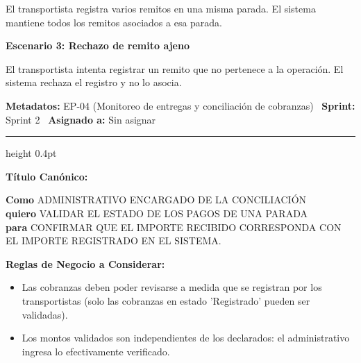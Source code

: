 \documentclass[a4paper,9pt]{article}
\begin{document}
\begin{tcolorbox}[hucard, title={\textbf{HU-36: REGISTRO DE REMITOS} \hfill \scriptsize \colorbox{redstatus}{\textbf{\ Rejected\ }} \quad \colorbox{white}{\textcolor{primarydark}{\textbf{\ 3 pts\ }}}}]
{El transportista registra varios remitos en una misma parada. El sistema mantiene todos los remitos asociados a esa parada.\par\vspace{2.5pt}
\noindent\textbf{\textcolor{secondarydark}{Escenario 3:  Rechazo de remito ajeno}}\par\vspace{1pt}
El transportista intenta registrar un remito que no pertenece a la operación. El sistema rechaza el registro y no lo asocia.\par\vspace{2.5pt}
}\par
\end{tcolorbox}

\begin{tcolorbox}[hucard, title={\textbf{HU-49: VALIDAR COBRANZA} \hfill \scriptsize \colorbox{bluestatus}{\textbf{\ New\ }} \quad \colorbox{white}{\textcolor{primarydark}{\textbf{\ 5 pts\ }}}}]
\vspace{-1pt}
\noindent\textbf{\footnotesize Metadatos:} EP-04 (Monitoreo de entregas y conciliación de cobranzas) \textbar\ \textbf{Sprint:} Sprint 2 \textbar\ \textbf{Asignado a:} Sin asignar\par\vspace{2pt}
\hrule height 0.4pt\par\vspace{3pt}
\noindent\textbf{\footnotesize Título Canónico:}\par\vspace{1pt}
{\small \textbf{Como} ADMINISTRATIVO ENCARGADO DE LA CONCILIACIÓN \\ \textbf{quiero} VALIDAR EL ESTADO DE LOS PAGOS DE UNA PARADA \\ \textbf{para} CONFIRMAR QUE EL IMPORTE RECIBIDO CORRESPONDA CON EL IMPORTE REGISTRADO EN EL SISTEMA.}\par\vspace{3pt}
\noindent\textbf{\footnotesize Reglas de Negocio a Considerar:}\par\vspace{1pt}
{\footnotesize
\begin{itemize}[leftmargin=12pt, nosep, itemsep=1.5pt, topsep=1pt]
\item Las cobranzas deben poder revisarse a medida que se registran por los transportistas (solo las cobranzas en estado 'Registrado' pueden ser validadas).
\item Los montos validados son independientes de los declarados: el administrativo ingresa lo efectivamente verificado.

\end{itemize}}
\end{tcolorbox}
\end{document}
